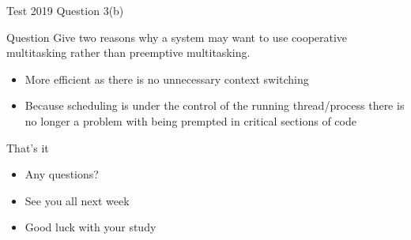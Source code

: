 \documentclass[notes]{beamer}
\begin{document}
\begin{frame}{Test 2019 Question 3(b)}
    \begin{alertblock}{Question}
        Give two reasons why a system may want to use cooperative multitasking rather than preemptive multitasking.
    \end{alertblock}
    \pause
    \begin{itemize}
        \item More efficient as there is no unnecessary context switching
        \item Because scheduling is under the control of the running thread/process there is no longer a problem with being prempted in critical sections of code
    \end{itemize}
\end{frame}
\begin{frame}{That's it}
    \begin{itemize}
        \item Any questions?
        \item See you all next week
        \item Good luck with your study
    \end{itemize}
\end{frame}
\end{document}
